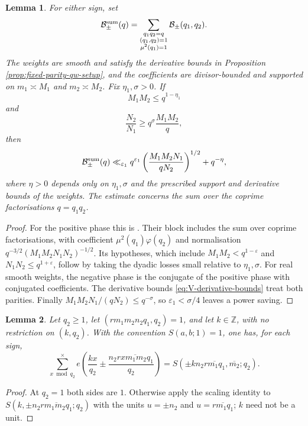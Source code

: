 \documentclass[12pt, a4paper]{amsart}
\numberwithin{equation}{section}
\newcommand{\e}{e}
\newcommand{\ep}{\varepsilon}
\renewcommand{\le}{\leqslant}
\renewcommand{\ge}{\geqslant}
\theoremstyle{plain}
\newtheorem{lem}{Lemma}[section]
\begin{document}
\begin{lem}\label{lem:fixed-factorisation-large-ratio}
For either sign, set
$$
\mathcal B_\pm^{\rm sum}(q)=
\sum_{\substack{q_1q_2=q\\ (q_1,q_2)=1\\ \mu^2(q_1)=1}}
\mathcal B_\pm(q_1,q_2).
$$
 The weights are smooth and satisfy the derivative bounds in Proposition \ref{prop:fixed-parity-qw-setup}, and the coefficients are divisor-bounded and supported on $m_1\asymp M_1$ and $m_2\asymp M_2$. Fix $\eta_1,\sigma>0$. If
$$
M_1M_2\le q^{1-\eta_1}
$$
and
$$
\frac{N_2}{N_1}\ge q^\sigma\frac{M_1M_2}{q},
$$
then
$$
\mathcal B_\pm^{\rm sum}(q)
\ll_{\varepsilon_1}
q^{\varepsilon_1}\left(\frac{M_1M_2N_1}{qN_2}\right)^{1/2}+q^{-\eta},
$$
where $\eta>0$ depends only on $\eta_1,\sigma$ and the prescribed support and derivative bounds of the weights. The estimate concerns the sum over the coprime factorisations $q=q_1q_2$.
\end{lem}

\begin{proof}
For the positive phase this is \cite[Lemma 3.1, with $\mathcal B$ defined on p.~8]{QW}. Their block includes the sum over coprime factorisations, with coefficient $\mu^2(q_1)\varphi(q_2)$ and normalisation $q^{-3/2}(M_1M_2N_1N_2)^{-1/2}$. Its hypotheses, which include $M_1M_2<q^{1-\ep}$ and $N_1N_2\le q^{1+\ep}$, follow by taking the dyadic losses small relative to $\eta_1,\sigma$. For real smooth weights, the negative phase is the conjugate of the positive phase with conjugated coefficients. The derivative bounds \eqref{eq:V-derivative-bounds} treat both parities. Finally $M_1M_2N_1/(qN_2)\le q^{-\sigma}$, so $\varepsilon_1<\sigma/4$ leaves a power saving.
\end{proof}

\begin{lem}\label{lem:corrected-complete-sum}
Let $q_2\ge1$, let $(rm_1m_2n_2q_1,q_2)=1$, and let $k\in\mathbb Z$, with no restriction on $(k,q_2)$. With the convention $S(a,b;1)=1$, one has, for each sign,
$$
\sum_{x\bmod q_2}^{\times}
\e\left(\frac{kx}{q_2}\pm \frac{n_2\overline{rxm_1m_2q_1}}{q_2}\right)
=
S(\pm kn_2\overline{rm_1q_1},\overline{m_2};q_2).
$$
\end{lem}

\begin{proof}
At $q_2=1$ both sides are $1$. Otherwise apply the scaling identity to $S(k,\pm n_2\overline{rm_1m_2q_1};q_2)$ with the units $u=\pm n_2$ and $u=\overline{rm_1q_1}$; $k$ need not be a unit.
\end{proof}
\end{document}
